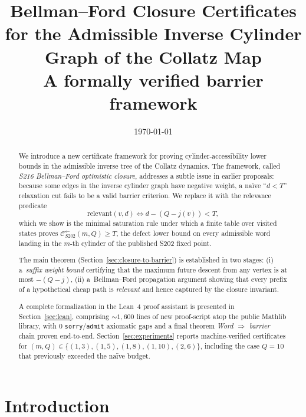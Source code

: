 \documentclass[11pt,a4paper]{article}
\title{Bellman--Ford Closure Certificates for the
       Admissible Inverse Cylinder Graph of the Collatz Map\\
       \large{A formally verified barrier framework}}
\date{\today}
\author{}
\theoremstyle{plain}
\theoremstyle{definition}
\theoremstyle{plain}
\newcommand{\Calphax}{\mathcal{C}^{\leftarrow}_{S202}}
\newcommand{\relevant}{\mathrm{relevant}}
\begin{document}
\maketitle


\begin{abstract}
We introduce a new certificate framework for proving cylinder-accessibility
lower bounds in the admissible inverse tree of the Collatz dynamics.
The framework, called \emph{S216 Bellman--Ford optimistic closure},
addresses a subtle issue in earlier proposals: because some edges in
the inverse cylinder graph have negative weight, a naïve
``$d < T$'' relaxation cut fails to be a valid barrier criterion.
We replace it with the relevance predicate
\[
  \relevant(v, d) \iff d - (Q - j(v)) < T,
\]
which we show is the minimal saturation rule under which a finite
table over visited states proves $\Calphax(m, Q) \ge T$, the defect
lower bound on every admissible word landing in the $m$-th cylinder
of the published S202 fixed point.

The main theorem (Section~\ref{sec:closure-to-barrier}) is established
in two stages:
(i) a~\emph{suffix weight bound} certifying that the maximum future
descent from any vertex is at most $-(Q - j)$,
(ii) a~Bellman--Ford propagation argument showing that every prefix of
a hypothetical cheap path is \emph{relevant} and hence captured by
the closure invariant.

A complete formalization in the Lean~4 proof assistant is presented
in Section~\ref{sec:lean}, comprising
${\sim}1{,}600$ lines of new proof-script atop the public Mathlib
library, with $0$ \texttt{sorry}/\texttt{admit} axiomatic gaps and a
final theorem
\emph{Word $\Rightarrow$ barrier} chain proven end-to-end.
Section~\ref{sec:experiments} reports machine-verified certificates
for $(m, Q) \in \{(1,3), (1,5), (1,8), (1,10), (2,6)\}$, including
the case $Q = 10$ that previously exceeded the naïve budget.
\end{abstract}

\section{Introduction}\label{sec:intro}
\end{document}
